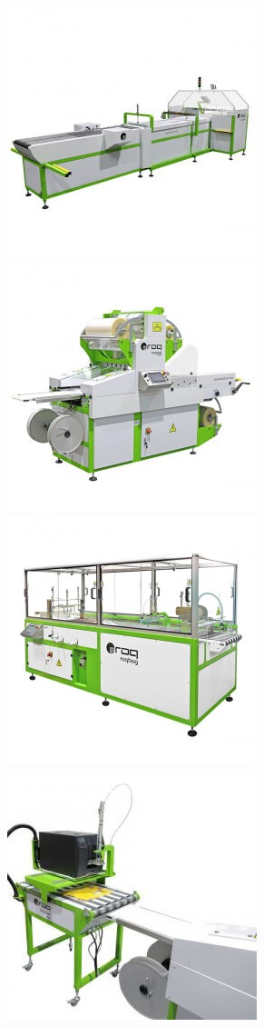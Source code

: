 \begin{frame}
\begin{figure}[ht]
\begin{center}
\includegraphics[scale=0.2]{"./image/ROQ/maquinas/600x6004-275x275.jpg"}
\includegraphics[scale=0.2]{"./image/ROQ/maquinas/600x6005-275x275.jpg"}
\includegraphics[scale=0.2]{"./image/ROQ/maquinas/600X600-275x275.jpg"}
\includegraphics[scale=0.2]{"./image/ROQ/maquinas/DR7A6026_WEB1-275x275.jpg"}

\end{center}
\end{figure}
\end{frame}
